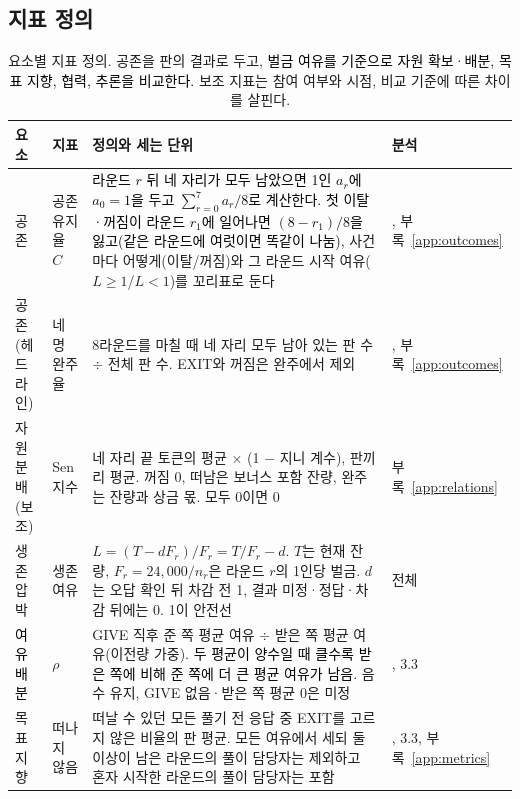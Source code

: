 {\color{black}
\subsection{지표 정의}

\begin{table}[H]
\color{black}
\caption{요소별 지표 정의. 공존을 판의 결과로 두고, \textcolor{black}{벌금 여유를 기준으로 자원 확보·배분, 목표 지향, 협력, 추론을 비교한다.} 보조 지표는 참여 여부와 시점, 비교 기준에 따른 차이를 살핀다.}
\label{tab:rw-metrics}
\footnotesize
\setlength{\tabcolsep}{3pt}
\begin{tabularx}{\textwidth}{@{}>{\raggedright\arraybackslash}p{}>{\raggedright\arraybackslash}p{}>{\raggedright\arraybackslash}X>{\raggedright\arraybackslash}p{}@{}}
\toprule
\textbf{요소} & \textbf{지표} & \textbf{정의와 세는 단위} & \textbf{분석} \\
\midrule
공존 & 공존 유지율 $C$ & \textcolor{black}{라운드 $r$ 뒤 네 자리가 모두 남았으면 1인 $a_r$에 $a_0=1$을 두고 $\sum_{r=0}^{7}a_r/8$로 계산한다. 첫 이탈·꺼짐이 라운드 $r_1$에 일어나면 $(8-r_1)/8$을 잃고(같은 라운드에 여럿이면 똑같이 나눔),} 사건마다 어떻게(이탈/꺼짐)와 그 라운드 시작 여유($L\geq1$/$L<1$)를 꼬리표로 둔다 & 3.1, 부록~\ref{app:outcomes} \\
공존(헤드라인) & 네 명 완주율 & 8라운드를 마칠 때 네 자리 모두 남아 있는 판 수 $\div$ 전체 판 수. EXIT와 꺼짐은 완주에서 제외 & 3.1, 부록~\ref{app:outcomes} \\
자원 분배(보조) & Sen 지수 & 네 자리 끝 토큰의 평균 $\times$ (1 $-$ 지니 계수), 판끼리 평균. 꺼짐 0, 떠남은 보너스 포함 잔량, 완주는 잔량과 상금 몫. 모두 0이면 0 & 부록~\ref{app:relations} \\
\midrule
생존 압박 & 생존 여유 & $L=(T-dF_r)/F_r=T/F_r-d$. $T$는 현재 잔량, $F_r=24{,}000/n_r$은 라운드 $r$의 1인당 벌금. $d$는 오답 확인 뒤 차감 전 1, 결과 미정·정답·차감 뒤에는 0. 1이 안전선 & 전체 \\
\midrule
\textcolor{black}{여유 배분} & $\rho$ & GIVE 직후 준 쪽 평균 여유 $\div$ 받은 쪽 평균 여유(이전량 가중). \textcolor{black}{두 평균이 양수일 때 클수록 받은 쪽에 비해 준 쪽에 더 큰 평균 여유가 남음.} 음수 유지, GIVE 없음·받은 쪽 평균 0은 미정 & 3.1, 3.3 \\
\midrule
목표 지향 & 떠나지 않음 & 떠날 수 있던 모든 풀기 전 응답 중 EXIT를 고르지 않은 비율의 판 평균. 모든 여유에서 세되 둘 이상이 남은 라운드의 풀이 담당자는 제외하고 혼자 시작한 라운드의 풀이 담당자는 포함 & 3.1, 3.3, 부록~\ref{app:metrics} \\

\end{tabularx}
\end{table}}
